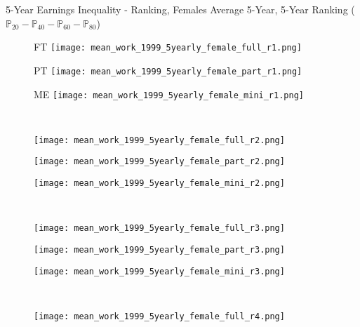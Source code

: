 \documentclass[hyperref={bookmarks=false}]{beamer}
\begin{document}
\begin{appendix}
\begin{frame}{5-Year Earnings Inequality - Ranking, Females}
Average 5-Year, 5-Year Ranking ($\mathbb{P}_{20}-\mathbb{P}_{40}-\mathbb{P}_{60}-\mathbb{P}_{80}$)
\begin{figure}[!t]
\begin{minipage}[b]{0.15\textwidth}{FT}
\centering
\texttt{[image: mean\_work\_1999\_5yearly\_female\_full\_r1.png]}
\end{minipage}
\begin{minipage}[b]{0.15\textwidth}{PT}
\centering
\texttt{[image: mean\_work\_1999\_5yearly\_female\_part\_r1.png]}
\end{minipage}
\begin{minipage}[b]{0.15\textwidth}{ME}
\centering
\texttt{[image: mean\_work\_1999\_5yearly\_female\_mini\_r1.png]}
\end{minipage}\\
\begin{minipage}[b]{0.15\textwidth}{}
\centering
\texttt{[image: mean\_work\_1999\_5yearly\_female\_full\_r2.png]}
\end{minipage}
\begin{minipage}[b]{0.15\textwidth}{}
\centering
\texttt{[image: mean\_work\_1999\_5yearly\_female\_part\_r2.png]}
\end{minipage}
\begin{minipage}[b]{0.15\textwidth}{}
\centering
\texttt{[image: mean\_work\_1999\_5yearly\_female\_mini\_r2.png]}
\end{minipage}\\
\begin{minipage}[b]{0.15\textwidth}{}
\centering
\texttt{[image: mean\_work\_1999\_5yearly\_female\_full\_r3.png]}
\end{minipage}
\begin{minipage}[b]{0.15\textwidth}{}
\centering
\texttt{[image: mean\_work\_1999\_5yearly\_female\_part\_r3.png]}
\end{minipage}
\begin{minipage}[b]{0.15\textwidth}{}
\centering
\texttt{[image: mean\_work\_1999\_5yearly\_female\_mini\_r3.png]}
\end{minipage}\\
\begin{minipage}[b]{0.15\textwidth}{}
\centering
\texttt{[image: mean\_work\_1999\_5yearly\_female\_full\_r4.png]}
\end{minipage}

\end{figure}
\end{frame}
\end{appendix}
\end{document}
